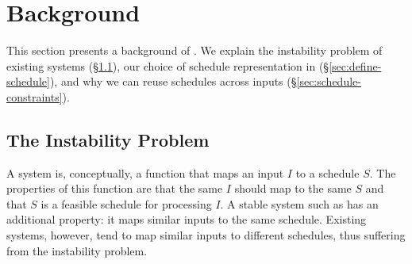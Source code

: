 \section{Background}
\label{sec:background}

This section presents a background of \tern. We explain the instability
problem of existing \dmt systems (\S\ref{sec:dmt-background}), our choice
of schedule representation in \tern (\S\ref{sec:define-schedule}), and why
we can reuse schedules across inputs (\S\ref{sec:schedule-constraints}).





\subsection{The Instability Problem} \label{sec:dmt-background}


A \dmt system is, conceptually, a function that maps an input $I$ to a
schedule $S$.  The properties of this function are that the same $I$
should map to the same $S$ and that $S$ is a feasible schedule for
processing $I$.  A stable \dmt system such as \tern has an additional
property: it maps similar inputs to the same schedule.  Existing \dmt
systems, however, tend to map similar inputs to different schedules, thus
suffering from the instability problem.  


